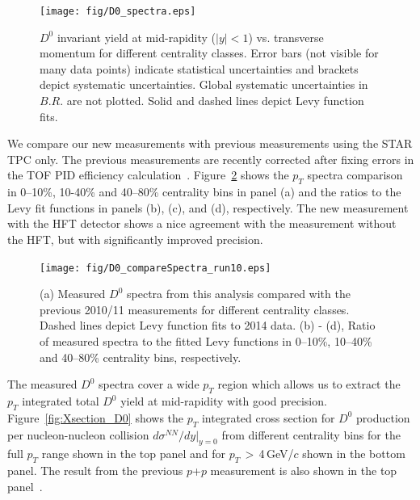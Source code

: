\documentclass[%
 reprint,	
 amsmath,amssymb,
 aps,
 prc,
]{revtex4-1}
\begin{document}
\begin{figure}
\centering
\texttt{[image: fig/D0\_spectra.eps]}
\caption{$D^{0}$ invariant yield at mid-rapidity ($|y|<1$) vs. transverse momentum for different centrality classes. Error bars (not visible for many data points) indicate statistical uncertainties and brackets depict systematic uncertainties. Global systematic uncertainties in $B.R.$ are not plotted. Solid and dashed lines depict Levy function fits.}
\label{fig:D0_spectra} 
\end{figure}


We compare our new measurements with previous measurements using the STAR TPC only. The previous measurements are recently corrected after fixing errors in the TOF PID efficiency calculation~\cite{Star_D_RAA}. Figure~\ref{fig:D0_compareSpectra_run10} shows the $p_{T}$ spectra comparison in 0--10\%, 10-40\% and 40--80\% centrality bins in panel (a) and the ratios to the Levy fit functions in panels (b), (c), and (d), respectively. The new measurement with the HFT detector shows a nice agreement with the measurement without the HFT, but with significantly improved precision.

\begin{figure}
\centering
\texttt{[image: fig/D0\_compareSpectra\_run10.eps]}
  \caption{(a) Measured $D^{0}$ spectra from this analysis compared with the previous 2010/11 measurements for different centrality classes. Dashed lines depict Levy function fits to 2014 data. (b) - (d), Ratio of measured spectra to the fitted Levy functions in 0--10\%, 10--40\% and 40--80\% centrality bins, respectively.}
\label{fig:D0_compareSpectra_run10} 
\end{figure}


The measured $D^0$ spectra cover a wide $p_{T}$ region which allows us to extract the $p_{T}$ integrated total $D^0$ yield at mid-rapidity with good precision. Figure~\ref{fig:Xsection_D0} shows the $p_{T}$ integrated cross section for $D^0$ production per nucleon-nucleon collision $d\sigma^{NN}/dy|_{y=0}$ from different centrality bins for the full $p_{T}$ range shown in the top panel and for $p_{T}$\,$>$\,4\,GeV/$c$ shown in the bottom panel. The result from the previous $p$+$p$ measurement is also shown in the top panel~\cite{Star_D_pp}.
\end{document}
